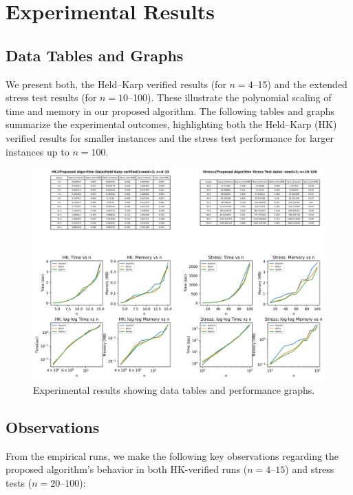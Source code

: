 \documentclass[sn-mathphys]{article}
\theoremstyle{thmstyleone}%
\theoremstyle{thmstyletwo}%
\theoremstyle{thmstylethree}%
\begin{document}
\section{Experimental Results}
\subsection{Data Tables and Graphs}
 We present both, the Held–Karp verified results (for $n=4$–15) 
and the extended stress test results (for $n=10$–100). 
These illustrate the polynomial scaling of time and memory in our proposed algorithm.
The following tables and graphs summarize the experimental outcomes, 
highlighting both the Held–Karp (HK) verified results for smaller instances 
and the stress test performance for larger instances up to $n=100$.
\clearpage
\begin{figure}[h]
    \centering
    \includegraphics[width=1.2\textwidth]{tsp_results.png}
    \caption{Experimental results showing data tables and performance graphs.}
    \label{fig:results}
\end{figure}

 \subsection{Observations}
 From the empirical runs, we make the following key observations regarding the
proposed algorithm’s behavior in both HK-verified runs ($n=4$–$15$) and stress
tests ($n=20$–$100$):
\end{document}
